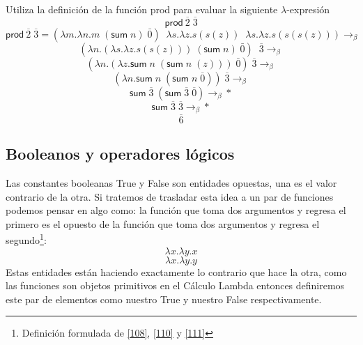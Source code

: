         \begin{exercise}
            Utiliza la definición de la función \textsf{prod} para evaluar la siguiente  $\lambda$-expresión
            \[
                    \textsf{prod}\  \overline{2} \; \overline{3} 
            \]
           \[
			 \textsf{prod}\  \overline{2} \; \overline{3}  = (\lambda m.\lambda n.m\; (\textsf{sum}\;n) \;  \bar{0}) \;\; \lambda s. \lambda z.s(s(z)) \;\; \lambda s. \lambda z.s(s(s(z))) \rightarrow_\beta
	     \]
	     \[
			(\lambda n. ( \lambda s. \lambda z.s(s(z)))\; (\textsf{sum} \; n) \;  \bar{0}) \;\;  \overline{3}   \rightarrow_\beta
	     \]
	     \[
			(\lambda n. (\lambda z.\textsf{sum} \; n \; (\textsf{sum} \; n \; (z))) \;  \bar{0}) \;  \overline{3}  \rightarrow_\beta
	     \]
	     \[
			(\lambda n.\textsf{sum} \; n \; (\textsf{sum} \; n \; \overline{0}))\; \overline{3}  \rightarrow_\beta
	     \]
	     \[
	       	\textsf{sum} \; \overline{3} \; (\textsf{sum} \; \overline{3} \; \overline{0})  \rightarrow_\beta*
              \]
	     \[
	       	\textsf{sum} \; \overline{3} \; \overline{3}  \rightarrow_\beta*
              \]
	    \[
		\overline{6}
	    \]


        \end{exercise}

    \subsection{Booleanos y operadores lógicos}
    Las constantes booleanas \textsf{True} y \textsf{False} son entidades opuestas, una es el valor contrario de la otra. Si tratemos de trasladar esta idea a un par de funciones podemos pensar en algo como:
    la función que toma dos argumentos y regresa el primero es el opuesto de la función que toma dos argumentos y regresa el segundo\footnote{Definición formulada de \hyperlink{108}{[108]},  \hyperlink{110}{[110]} y  \hyperlink{111}{[111]}}:
    \[
        \lambda x.\lambda y.x
    \]
    \[
        \lambda x.\lambda y.y
    \]
    Estas entidades están haciendo exactamente lo contrario que hace la otra, como las funciones son objetos primitivos en el Cálculo Lambda entonces definiremos este par de elementos como nuestro \textsf{True} y nuestro \textsf{False} respectivamente.

